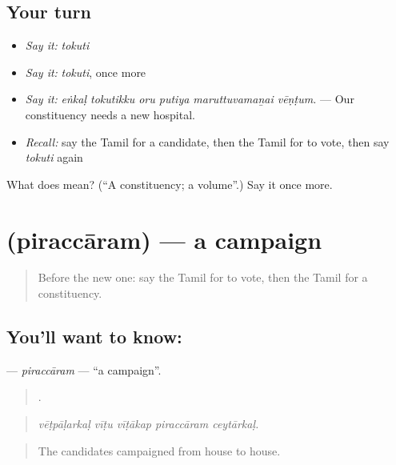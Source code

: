 \subsection*{Your turn}
\begin{itemize}
\raggedright
  \item \emph{Say it:} \emph{tokuti}
  \item \emph{Say it:} \emph{tokuti}, once more
  \item \emph{Say it:} \emph{eṅkaḷ tokutikku oru putiya maruttuvamaṉai vēṇṭum.} — Our constituency needs a new hospital.
  \item \emph{Recall:} say the Tamil for a candidate, then the Tamil for to vote, then say \emph{tokuti} again
\end{itemize}

\begin{tcolorbox}[breakable,colback=teal!4,colframe=teal!35!black,title={Before you move on}]
What does  mean? (\textquotedblleft{}A constituency; a volume\textquotedblright{}.) Say it once more.
\end{tcolorbox}
\section[\texorpdfstring{\ta{பிரச்சாரம்} (piraccāram)}{பிரச்சாரம் (piraccāram)}]{ (piraccāram) — a campaign}

\label{lesson:TA-C374-piraccaram}



\begin{quote}
Before the new one: say the Tamil for to vote, then the Tamil for a constituency.
\end{quote}

\subsection*{You'll want to know: }
\textbf{} — \emph{piraccāram} — \textquotedblleft{}a campaign\textquotedblright{}.

\begin{quote}
    .
\end{quote}

\begin{quote}
\emph{vēṭpāḷarkaḷ vīṭu vīṭākap piraccāram ceytārkaḷ.}
\end{quote}

\begin{quote}
The candidates campaigned from house to house.
\end{quote}

